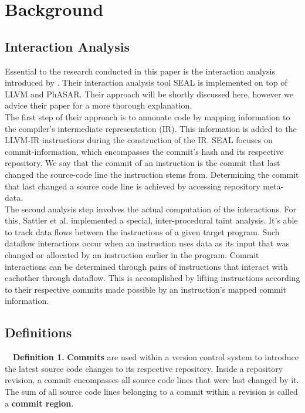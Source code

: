 \section*{Background}\label{ch:background}

\subsection*{Interaction Analysis}

Essential to the research conducted in this paper is the interaction analysis introduced by \citet{sattler2023seal}.
Their interaction analysis tool SEAL is implemented on top of LLVM and PhASAR.
Their approach will be shortly discussed here, however we advice their paper for a more thorough explanation. \\
The first step of their approach is to annonate code by mapping information to the compiler's intermediate representation (IR).
This information is added to the LLVM-IR instructions during the construction of the IR.
SEAL focuses on commit-information, which encompasses the commit's hash and its respective repository.
We say that the commit of an instruction is the commit that last changed the source-code line the instruction stems from.
Determining the commit that last changed a source code line is achieved by accessing repository meta-data. \\
The second analysis step involves the actual computation of the interactions.
For this, Sattler et al. implemented a special, inter-procedural taint analysis.
It's able to track data flows between the instructions of a given target program.
Such dataflow interactions occur when an instruction uses data as its input that was changed or allocated by an instruction earlier in the program.
Commit interactions can be determined through pairs of instructions that interact with eachother through dataflow.
This is accomplished by lifting instructions according to their respective commits made possible by an instruction's mapped commit information.

\subsection*{Definitions}

\ \ \textbf{Definition 1.} \textbf{Commits} are used within a version control system to introduce the latest source code changes to its respective repository.
Inside a repository revision, a commit encompasses all source code lines that were last changed by it.
The sum of all source code lines belonging to a commit within a revision is called a \textbf{commit region}. \\


